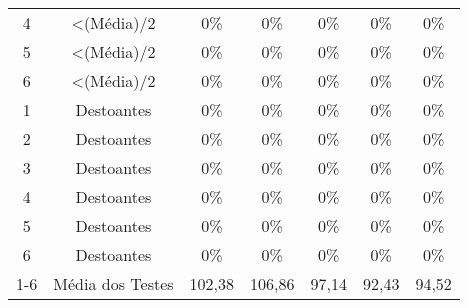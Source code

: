 \begin{table}[]
\begin{tabular}{|c|c|ccccc|}
4                         & \textless (Média)/2                                                        & 0\%                     & 0\%                     & 0\%                    & 0\%                    & 0\%                     \\
5                         & \textless (Média)/2                                                        & 0\%                     & 0\%                     & 0\%                    & 0\%                    & 0\%                     \\
6                         & \textless (Média)/2                                                        & 0\%                     & 0\%                     & 0\%                    & 0\%                    & 0\%                     \\ \hline
1                         & Destoantes                                                                 & 0\%                     & 0\%                     & 0\%                    & 0\%                    & 0\%                     \\
2                         & Destoantes                                                                 & 0\%                     & 0\%                     & 0\%                    & 0\%                    & 0\%                     \\
3                         & Destoantes                                                                 & 0\%                     & 0\%                     & 0\%                    & 0\%                    & 0\%                     \\
4                         & Destoantes                                                                 & 0\%                     & 0\%                     & 0\%                    & 0\%                    & 0\%                     \\
5                         & Destoantes                                                                 & 0\%                     & 0\%                     & 0\%                    & 0\%                    & 0\%                     \\
6                         & Destoantes                                                                 & 0\%                     & 0\%                     & 0\%                    & 0\%                    & 0\%                     \\ \hline
1-6 & Média dos Testes                                                           & 102,38 & 106,86 & 97,14 & 92,43 & 94,52 \\ \hline

\end{tabular}
\end{table}

